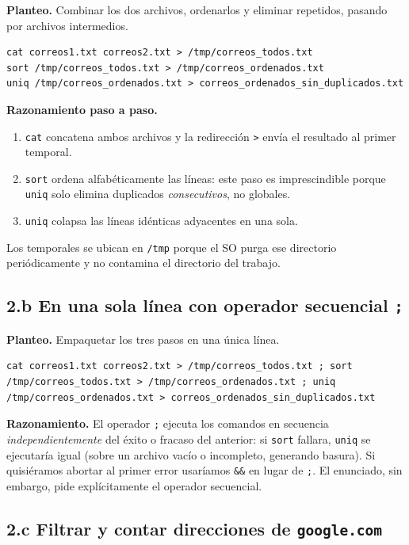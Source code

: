 \documentclass[11pt,a4paper]{article}
\begin{document}
\textbf{Planteo.} Combinar los dos archivos, ordenarlos y eliminar
repetidos, pasando por archivos intermedios.

\begin{lstlisting}
cat correos1.txt correos2.txt > /tmp/correos_todos.txt
sort /tmp/correos_todos.txt > /tmp/correos_ordenados.txt
uniq /tmp/correos_ordenados.txt > correos_ordenados_sin_duplicados.txt
\end{lstlisting}

\textbf{Razonamiento paso a paso.}
\begin{enumerate}[leftmargin=*]
    \item \texttt{cat} concatena ambos archivos y la redirección
        \texttt{>} envía el resultado al primer temporal.
    \item \texttt{sort} ordena alfabéticamente las líneas: este paso es
        imprescindible porque \texttt{uniq} solo elimina duplicados
        \emph{consecutivos}, no globales.
    \item \texttt{uniq} colapsa las líneas idénticas adyacentes en una
        sola.
\end{enumerate}

Los temporales se ubican en \texttt{/tmp} porque el SO purga ese
directorio periódicamente y no contamina el directorio del trabajo.

\subsection*{2.b En una sola línea con operador secuencial \texttt{;}}

\textbf{Planteo.} Empaquetar los tres pasos en una única línea.

\begin{lstlisting}
cat correos1.txt correos2.txt > /tmp/correos_todos.txt ; sort /tmp/correos_todos.txt > /tmp/correos_ordenados.txt ; uniq /tmp/correos_ordenados.txt > correos_ordenados_sin_duplicados.txt
\end{lstlisting}

\textbf{Razonamiento.} El operador \texttt{;} ejecuta los comandos en
secuencia \emph{independientemente} del éxito o fracaso del anterior:
si \texttt{sort} fallara, \texttt{uniq} se ejecutaría igual (sobre un
archivo vacío o incompleto, generando basura). Si quisiéramos abortar
al primer error usaríamos \texttt{\&\&} en lugar de \texttt{;}. El
enunciado, sin embargo, pide explícitamente el operador secuencial.

\subsection*{2.c Filtrar y contar direcciones de \texttt{google.com}}
\end{document}
